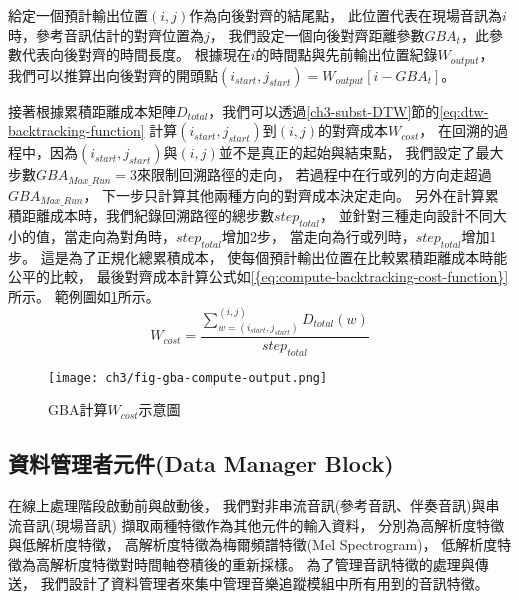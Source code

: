 \documentclass[class=NCU_thesis, crop=false]{standalone}
\begin{document}
給定一個預計輸出位置$(i, j)$作為向後對齊的結尾點，
此位置代表在現場音訊為$i$時，參考音訊估計的對齊位置為$j$，
我們設定一個向後對齊距離參數$GBA_{t}$，此參數代表向後對齊的時間長度。
根據現在$i$的時間點與先前輸出位置紀錄$W_{output}$，
我們可以推算出向後對齊的開頭點$(i_{start}, j_{start}) = W_{output}[i-GBA_{t}]$。

接著根據累積距離成本矩陣$D_{total}$，我們可以透過\ref{ch3-subst-DTW}節的\cref{eq:dtw-backtracking-function}
計算$(i_{start}, j_{start})$到$(i, j)$的對齊成本$W_{cost}$，
在回溯的過程中，因為$(i_{start}, j_{start})$與$(i, j)$並不是真正的起始與結束點，
我們設定了最大步數$GBA_{Max\_Run}=3$來限制回溯路徑的走向，
若過程中在行或列的方向走超過$GBA_{Max\_Run}$，
下一步只計算其他兩種方向的對齊成本決定走向。
另外在計算累積距離成本時，我們紀錄回溯路徑的總步數$step_{total}$，
並針對三種走向設計不同大小的值，當走向為對角時，$step_{total}$增加2步，
當走向為行或列時，$step_{total}$增加1步。
這是為了正規化總累積成本，
使每個預計輸出位置在比較累積距離成本時能公平的比較，
最後對齊成本計算公式如\cref{{eq:compute-backtracking-cost-function}}所示。
範例圖如\cref{fig:fig-ch3-gba-compute-output}所示。
\begin{equation}
    \label{eq:compute-backtracking-cost-function}
    W_{cost} = \frac{\sum_{w = (i_{start}, j_{start})}^{(i, j)}D_{total}(w)}{step_{total}} 
\end{equation}

\begin{figure}[H]
    \centering
    \texttt{[image: ch3/fig-gba-compute-output.png]}
    \caption{GBA計算$W_{cost}示意圖$}
    \label{fig:fig-ch3-gba-compute-output}
\end{figure}



\subsection{資料管理者元件(Data Manager Block)} \label{ch3-subst-data-manager}
在線上處理階段啟動前與啟動後，
我們對非串流音訊(參考音訊、伴奏音訊)與串流音訊(現場音訊)
擷取兩種特徵作為其他元件的輸入資料，
分別為高解析度特徵與低解析度特徵，
高解析度特徵為梅爾頻譜特徵(Mel Spectrogram)\cite{abdul2022mel}，
低解析度特徵為高解析度特徵對時間軸卷積後的重新採樣。
為了管理音訊特徵的處理與傳送，
我們設計了資料管理者來集中管理音樂追蹤模組中所有用到的音訊特徵。
\end{document}
